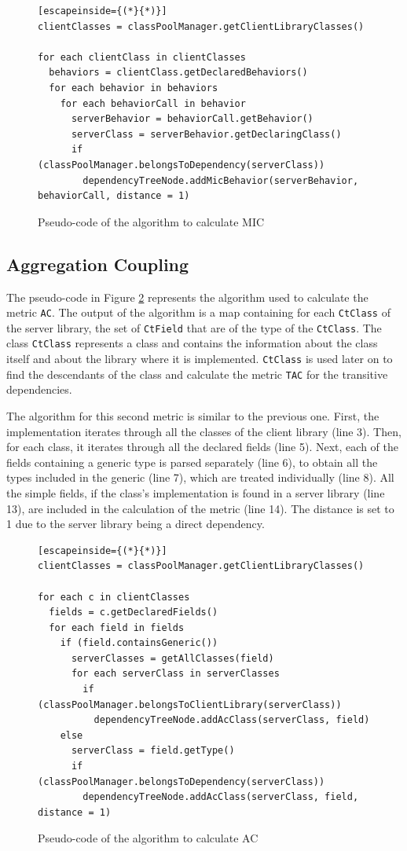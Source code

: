 \begin{figure}[ht!]
\begin{lstlisting}[escapeinside={(*}{*)}]
clientClasses = classPoolManager.getClientLibraryClasses()

for each clientClass in clientClasses
  behaviors = clientClass.getDeclaredBehaviors()
  for each behavior in behaviors
    for each behaviorCall in behavior
      serverBehavior = behaviorCall.getBehavior()
      serverClass = serverBehavior.getDeclaringClass()
      if (classPoolManager.belongsToDependency(serverClass))
        dependencyTreeNode.addMicBehavior(serverBehavior, behaviorCall, distance = 1)
\end{lstlisting}
\caption{Pseudo-code of the algorithm to calculate MIC}
\label{fig:algorithm-mic}
\end{figure}

\subsection{Aggregation Coupling}
The pseudo-code in Figure \ref{fig:algorithm-ac} represents the algorithm used to calculate the metric \texttt{AC}. The output of the algorithm is a map containing for each \texttt{CtClass} of the server library, the set of \texttt{CtField} that are of the type of the \texttt{CtClass}. The class \texttt{CtClass} represents a class and contains the information about the class itself and about the library where it is implemented. \texttt{CtClass} is used later on to find the descendants of the class and calculate the metric \texttt{TAC} for the transitive dependencies.

The algorithm for this second metric is similar to the previous one. First, the implementation iterates through all the classes of the client library (line 3). Then, for each class, it iterates through all the declared fields (line 5). Next, each of the fields containing a generic type is parsed separately (line 6), to obtain all the types included in the generic (line 7), which are treated individually (line 8). All the simple fields, if the class's implementation is found in a server library (line 13), are included in the calculation of the metric (line 14). The distance is set to 1 due to the server library being a direct dependency.

\begin{figure}[ht!]
\begin{lstlisting}[escapeinside={(*}{*)}]
clientClasses = classPoolManager.getClientLibraryClasses()

for each c in clientClasses
  fields = c.getDeclaredFields()
  for each field in fields
    if (field.containsGeneric())
      serverClasses = getAllClasses(field)
      for each serverClass in serverClasses
        if (classPoolManager.belongsToClientLibrary(serverClass))
          dependencyTreeNode.addAcClass(serverClass, field)
    else
      serverClass = field.getType()
      if (classPoolManager.belongsToDependency(serverClass))
        dependencyTreeNode.addAcClass(serverClass, field, distance = 1)
\end{lstlisting}
\caption{Pseudo-code of the algorithm to calculate AC}
\label{fig:algorithm-ac}
\end{figure}


